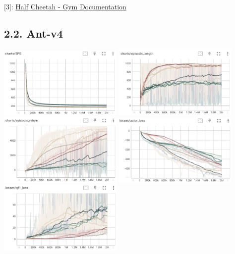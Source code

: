 \documentclass[english, a4paper,12pt]{article}
\begin{document}
\begin{flushright}
\scriptsize [3]: \href{https://www.gymlibrary.dev/environments/mujoco/half_cheetah/}{Half Cheetah - Gym Documentation}
\end{flushright}
\newpage
\subsection*{2.2. Ant-v4}

\includegraphics[width=6cm]{SPS_ant.png}
\includegraphics[width=6cm]{episodic_length_ant.png}
\includegraphics[width=6cm]{episodic_return_ant.png}
\includegraphics[width=6cm]{actor_loss_ant.png}
\includegraphics[width=6cm]{qf1_loss_ant.png}
\end{document}
